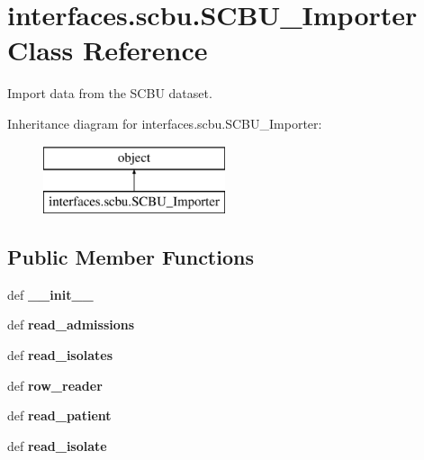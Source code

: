 \hypertarget{classinterfaces_1_1scbu_1_1_s_c_b_u___importer}{\section{interfaces.\-scbu.\-S\-C\-B\-U\-\_\-\-Importer Class Reference}
\label{classinterfaces_1_1scbu_1_1_s_c_b_u___importer}
}


Import data from the S\-C\-B\-U dataset.  


Inheritance diagram for interfaces.\-scbu.\-S\-C\-B\-U\-\_\-\-Importer\-:\begin{figure}[H]
\begin{center}
\leavevmode
\includegraphics[height=2.000000cm]{classinterfaces_1_1scbu_1_1_s_c_b_u___importer}
\end{center}
\end{figure}
\subsection*{Public Member Functions}
\begin{DoxyCompactItemize}
\item 
\hypertarget{classinterfaces_1_1scbu_1_1_s_c_b_u___importer_a4310e98f8f35790aacf05b93ead2c82d}{def {\bfseries \-\_\-\-\_\-init\-\_\-\-\_\-}}\label{classinterfaces_1_1scbu_1_1_s_c_b_u___importer_a4310e98f8f35790aacf05b93ead2c82d}

\item 
\hypertarget{classinterfaces_1_1scbu_1_1_s_c_b_u___importer_a06971583e80184b2a9df31e9851ffc82}{def {\bfseries read\-\_\-admissions}}\label{classinterfaces_1_1scbu_1_1_s_c_b_u___importer_a06971583e80184b2a9df31e9851ffc82}

\item 
\hypertarget{classinterfaces_1_1scbu_1_1_s_c_b_u___importer_af33ca39f561a06a52cd587e69dc1c5fb}{def {\bfseries read\-\_\-isolates}}\label{classinterfaces_1_1scbu_1_1_s_c_b_u___importer_af33ca39f561a06a52cd587e69dc1c5fb}

\item 
\hypertarget{classinterfaces_1_1scbu_1_1_s_c_b_u___importer_a7c8ddb25c73b2ce5964dd8f3d66d1d4f}{def {\bfseries row\-\_\-reader}}\label{classinterfaces_1_1scbu_1_1_s_c_b_u___importer_a7c8ddb25c73b2ce5964dd8f3d66d1d4f}

\item 
\hypertarget{classinterfaces_1_1scbu_1_1_s_c_b_u___importer_aae60a9a7be72f16395ce06e97319a3b9}{def {\bfseries read\-\_\-patient}}\label{classinterfaces_1_1scbu_1_1_s_c_b_u___importer_aae60a9a7be72f16395ce06e97319a3b9}

\item 
\hypertarget{classinterfaces_1_1scbu_1_1_s_c_b_u___importer_a28452dce028c58a59319075970f2bf9b}{def {\bfseries read\-\_\-isolate}}\label{classinterfaces_1_1scbu_1_1_s_c_b_u___importer_a28452dce028c58a59319075970f2bf9b}

\end{DoxyCompactItemize}
